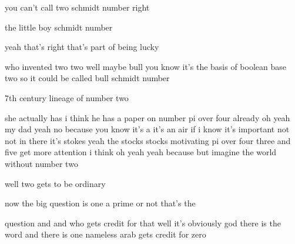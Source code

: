 \begin{description}
you can't call two schmidt number right

the little boy schmidt number

yeah that's right that's part of being lucky

who invented two two well maybe bull you know it's the basis of boolean base two so it could be called bull schmidt number

7th century lineage of number two

she actually has i think he has a paper on number pi over four already oh yeah my dad yeah no because you know it's a it's an air if i know it's important not not in there it's stokes yeah the stocks stocks motivating pi over four three and five get more attention i think oh yeah yeah because but imagine the world without number two

well two gets to be ordinary

now the big question is one a prime or not that's the

question and and who gets credit for that well it's obviously god there is the word and there is one nameless arab gets credit for zero


\end{description}
